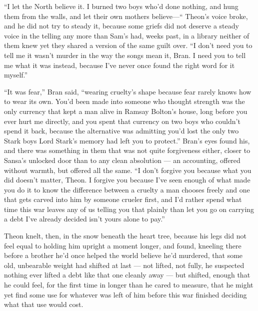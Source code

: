 “I let the North believe it. I burned two boys who’d done nothing, and hung them from the walls, and let their own mothers believe—“ Theon’s voice broke, and he did not try to steady it, because some griefs did not deserve a steady voice in the telling any more than Sam’s had, weeks past, in a library neither of them knew yet they shared a version of the same guilt over. “I don’t need you to tell me it wasn’t murder in the way the songs mean it, Bran. I need you to tell me what it was instead, because I’ve never once found the right word for it myself.”

“It was fear,” Bran said, “wearing cruelty’s shape because fear rarely knows how to wear its own. You’d been made into someone who thought strength was the only currency that kept a man alive in Ramsay Bolton’s house, long before you ever hurt me directly, and you spent that currency on two boys who couldn’t spend it back, because the alternative was admitting you’d lost the only two Stark boys Lord Stark’s memory had left you to protect.” Bran’s eyes found his, and there was something in them that was not quite forgiveness either, closer to Sansa’s unlocked door than to any clean absolution — an accounting, offered without warmth, but offered all the same. “I don’t forgive you because what you did doesn’t matter, Theon. I forgive you because I’ve seen enough of what made you do it to know the difference between a cruelty a man chooses freely and one that gets carved into him by someone crueler first, and I’d rather spend what time this war leaves any of us telling you that plainly than let you go on carrying a debt I’ve already decided isn’t yours alone to pay.”

Theon knelt, then, in the snow beneath the heart tree, because his legs did not feel equal to holding him upright a moment longer, and found, kneeling there before a brother he’d once helped the world believe he’d murdered, that some old, unbearable weight had shifted at last — not lifted, not fully, he suspected nothing ever lifted a debt like that one cleanly away — but shifted, enough that he could feel, for the first time in longer than he cared to measure, that he might yet find some use for whatever was left of him before this war finished deciding what that use would cost.